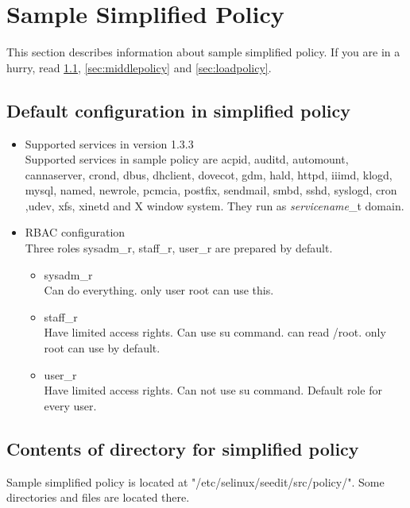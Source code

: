\section{Sample Simplified Policy}
This section describes information about sample simplified
policy. If you are in a hurry, read \ref{sec:default}, \ref{sec:middlepolicy} and \ref{sec:loadpolicy}.
\subsection{Default configuration in simplified policy}\label{sec:default}
\begin{itemize}
 \item Supported services in version 1.3.3\\
       Supported services in sample policy are acpid, auditd, automount,
       cannaserver, crond, dbus, dhclient, dovecot, gdm,  hald,
       httpd, iiimd, klogd,  mysql, named, newrole, pcmcia, postfix,
       sendmail, smbd, sshd, syslogd, cron ,udev, xfs, xinetd and X
       window system. 
 They run as {\it servicename}\_t domain.
 \item RBAC configuration\\
      Three roles sysadm\_r, staff\_r, user\_r are prepared by
       default.\\
       \begin{itemize}
	\item sysadm\_r\\
	      Can do everything. only user root can use this.
	\item staff\_r\\
	      Have limited access rights. Can use su command. can read
	      /root. only root can use by default.
	\item user\_r\\
	      Have limited access rights. Can not use su
	      command. Default role for every user.
       \end{itemize}
\end{itemize}

\subsection{Contents of directory for simplified policy}
 Sample simplified policy is located at
 "/etc/selinux/seedit/src/policy/". 
Some directories and files are located there.
